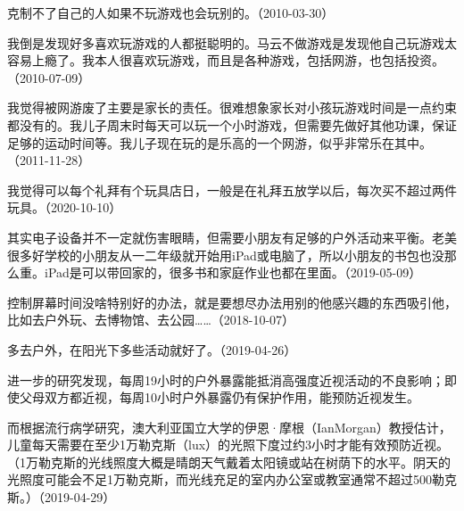 
克制不了自己的人如果不玩游戏也会玩别的。（2010-03-30）


我倒是发现好多喜欢玩游戏的人都挺聪明的。马云不做游戏是发现他自己玩游戏太容易上瘾了。我本人很喜欢玩游戏，而且是各种游戏，包括网游，也包括投资。（2010-07-09）


我觉得被网游废了主要是家长的责任。很难想象家长对小孩玩游戏时间是一点约束都没有的。我儿子周末时每天可以玩一个小时游戏，但需要先做好其他功课，保证足够的运动时间等。我儿子现在玩的是乐高的一个网游，似乎非常乐在其中。（2011-11-28）


我觉得可以每个礼拜有个玩具店日，一般是在礼拜五放学以后，每次买不超过两件玩具。（2020-10-10）


其实电子设备并不一定就伤害眼睛，但需要小朋友有足够的户外活动来平衡。老美很多好学校的小朋友从一二年级就开始用iPad或电脑了，所以小朋友的书包也没那么重。iPad是可以带回家的，很多书和家庭作业也都在里面。（2019-05-09）


控制屏幕时间没啥特别好的办法，就是要想尽办法用别的他感兴趣的东西吸引他，比如去户外玩、去博物馆、去公园……（2018-10-07）


多去户外，在阳光下多些活动就好了。（2019-04-26）

进一步的研究发现，每周19小时的户外暴露能抵消高强度近视活动的不良影响；即使父母双方都近视，每周10小时户外暴露仍有保护作用，能预防近视发生。

而根据流行病学研究，澳大利亚国立大学的伊恩·摩根（IanMorgan）教授估计，儿童每天需要在至少1万勒克斯（lux）的光照下度过约3小时才能有效预防近视。（1万勒克斯的光线照度大概是晴朗天气戴着太阳镜或站在树荫下的水平。阴天的光照度可能会不足1万勒克斯，而光线充足的室内办公室或教室通常不超过500勒克斯。）（2019-04-29）

